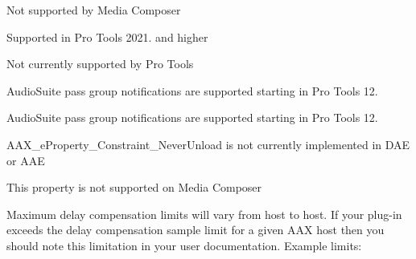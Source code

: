 \begin{DoxyRefList}
Not supported by Media Composer 
\item[Member \mbox{\hyperlink{a00524_afab5ea2cfd731fc8f163b6caa685406ea938f1966bb57c8a39137c75f67748ad0}{AAX\+\_\+e\+Notification\+Event\+\_\+\+Transport\+State\+Changed}} ]\label{a00879__compatibility_notes000042}%
%
 Supported in Pro Tools 2021. and higher 
\item[Member \mbox{\hyperlink{a00524_a86f7310877399d9d4d2ea4863d472476a2524774deef9e82058134126dc729a5a}{AAX\+\_\+e\+Plug\+In\+Strings\+\_\+\+Progress}} ]\label{a00879__compatibility_notes000021}%
%
 Not currently supported by Pro Tools 
\item[Member \mbox{\hyperlink{a00524_a6ec854be40c8cf810dec97de3e56c0a7a1fb443ff62601d3e5f5562a4af8edf41}{AAX\+\_\+e\+Processing\+State\+\_\+\+Begin\+Pass\+Group}} ]\label{a00879__compatibility_notes000047}%
%
 Audio\+Suite pass group notifications are supported starting in Pro Tools 12.  
\item[Member \mbox{\hyperlink{a00524_a6ec854be40c8cf810dec97de3e56c0a7a6c7dcf22600f9fe8a6113dbd5ffd1605}{AAX\+\_\+e\+Processing\+State\+\_\+\+End\+Pass\+Group}} ]\label{a00879__compatibility_notes000046}%
%
 Audio\+Suite pass group notifications are supported starting in Pro Tools 12.  
\item[Member \mbox{\hyperlink{a00737_a13e384f22825afd3db6d68395b79ce0da734930f534d7af40835db1b12afb209e}{AAX\+\_\+e\+Property\+\_\+\+Constraint\+\_\+\+Never\+Unload}} ]\label{a00879__compatibility_notes000068}%
%
 AAX\+\_\+e\+Property\+\_\+\+Constraint\+\_\+\+Never\+Unload is not currently implemented in DAE or AAE  
\item[Member \mbox{\hyperlink{a00737_a13e384f22825afd3db6d68395b79ce0dadd8839e5678c8880215e318197cc8d3a}{AAX\+\_\+e\+Property\+\_\+\+Destination\+Track}} ]\label{a00879__compatibility_notes000066}%
%
 This property is not supported on Media Composer 
\item[Member \mbox{\hyperlink{a00737_a13e384f22825afd3db6d68395b79ce0daa9037ffd2caf892bafe8f7f170548cb4}{AAX\+\_\+e\+Property\+\_\+\+Latency\+Contribution}} ]\label{a00879__compatibility_notes000062}%
%
 Maximum delay compensation limits will vary from host to host. If your plug-\/in exceeds the delay compensation sample limit for a given AAX host then you should note this limitation in your user documentation. Example limits\+:

\end{DoxyRefList}
